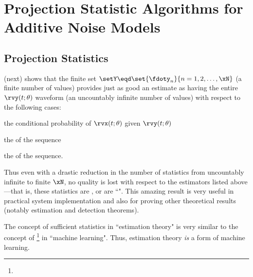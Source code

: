 \chapter[Projection Statistic Algorithms]
        {Projection Statistic Algorithms for Additive Noise Models}
\section{Projection Statistics}
 (next) shows that the finite set
$\setY\eqd\set{\fdoty_n}{n=1,2,\ldots,\xN}$ (a finite number of values) provides just as
good an estimate as having the entire $\rvy(t;\theta)$ waveform
(an uncountably infinite number of values)
with respect to the following cases:
\begin{enume}
   \item the conditional probability of $\rvx(t;\theta)$ given $\rvy(t;\theta)$
   \item the  of the sequence
   \item the   of the sequence.
\end{enume}
Thus even with a drastic reduction in the number of statistics
from uncountably infinite to finite $\xN$,
no quality is lost with respect to the estimators listed above---that
is, these statistics are , or are ``".
This amazing result is very useful in practical system implementation
and also for proving other theoretical results
(notably estimation and detection theorems).

The concept of sufficient statistics in ``estimation theory" is very similar
to the concept of \footnote{
  }
in ``machine learning".
Thus, estimation theory \emph{is} a form of machine learning.

